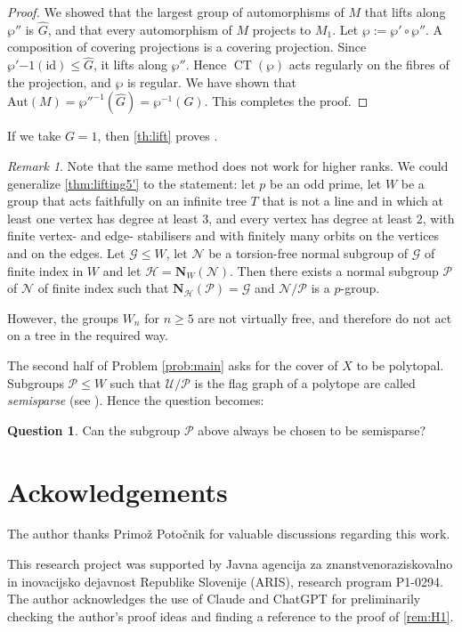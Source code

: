 \documentclass{amsart}
\theoremstyle{plain}
\theoremstyle{definition}
\newtheorem{question}[theorem]{Question}
\theoremstyle{remark}
\newtheorem{remark}[theorem]{Remark}
\newcommand{\U}{\mathcal U}
\renewcommand{\P}{\mathcal P}
\newcommand{\N}{\mathcal N}
\renewcommand{\H}{\mathcal H}
\newcommand{\G}{\mathcal G}
\newcommand{\No}{\mathbf N}
\newcommand{\Aut}{\mathrm{Aut}}
\newcommand{\id}{{\mathrm{id}}}
\DeclareMathOperator{\CT}{CT}
\begin{document}
\begin{proof}
    We showed that the largest group of automorphisms of $M$ that lifts along $\wp''$ is $\hat G$, and that every automorphism of $M$ projects to $M_1$. Let $\wp := \wp'\circ \wp''$. A composition of covering projections is a covering projection. Since $\wp'{-1}(\id) \le \hat G$, it lifts along $\wp''$. Hence $\CT(\wp)$ acts regularly on the fibres of the projection, and $\wp$ is regular. We have shown that $\Aut(M) = \wp''^{-1}(\hat G) = \wp^{-1}(G)$. This completes the proof.
\end{proof} 

If we take $G=1$, then \cref{th:lift} proves .

\begin{remark} 
  Note that the same method does not work for higher ranks.
  We could generalize \cref{thm:lifting5'} to the statement:
  let $p$ be
	an odd prime, let $W$ be a group that acts faithfully on an infinite tree $T$ that is not
	a line and in which at least one vertex has degree at least $3$, and every vertex has degree at least $2$, with finite vertex- and edge-
	stabilisers and with finitely many orbits on the vertices and on the edges. Let
	$\G\le W$, let $\N$ be a torsion-free normal subgroup of $\G$ of finite index in $W$ and
	let $\H=\No_{W}(\N)$. Then there exists a normal subgroup $\P$ of $\N$ of finite index
	such that $\No_{\H}(\P)=\G$ and $\N/\P$ is a $p$-group. 

  However, the groups $W_n$ for $n \ge 5$ are not virtually free, and
  therefore do not act on a tree in the required way.
\end{remark}

The second half of Problem \ref{prob:main} asks for the cover of $X$ to be polytopal. Subgroups $\P \le W$
such that $\U/\P$ is the flag graph of a polytope are called \emph{semisparse}
(see \cite{HubardToledo2023, Hartley1999}). Hence the question becomes:


\begin{question}
Can the subgroup $\P$ above always be chosen to be semisparse?
\end{question}

\section{Ackowledgements}
The author thanks Primož Potočnik for valuable discussions regarding this work.

This research project was supported by Javna agencija za znanstvenoraziskovalno in inovacijsko
dejavnost Republike Slovenije (ARIS), research program P1-0294. The author acknowledges the use of Claude and ChatGPT for preliminarily checking the author's proof ideas and finding a reference to the proof of \cref{rem:H1}.

\printbibliography
\end{document}
